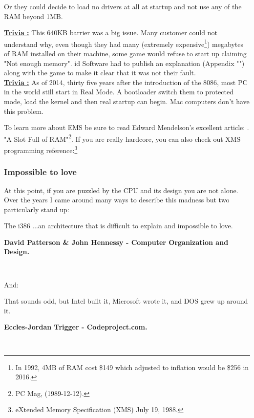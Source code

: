 \documentclass[book.tex]{subfiles}
\begin{document}
Or they could decide to load no drivers at all at startup and not use any of the RAM beyond 1MB.\\
\par
\textbf{\underline{Trivia :}}  This 640KB barrier was a big issue. Many customer could not understand why, even though they had many (extremely expensive\footnote{In 1992, 4MB of RAM cost \$149 which adjusted to inflation would be \$256 in 2016.}) megabytes of RAM installed on their machine, some game would refuse to start up claiming "Not enough memory". id Software had to publish an explanation (Appendix "") along with the game to make it clear that it was not their fault.\\

\textbf{\underline{Trivia :}}  As of 2014, thirty five years after the introduction of the 8086, most PC in the world still start in Real Mode. A bootloader switch them to protected mode, load the kernel and then real startup can begin. Mac computers don't have this problem.

\bigskip
To learn more about EMS be sure to read Edward Mendelson's excellent article: . "A Slot Full of RAM"\footnote{PC Mag, (1989-12-12).}. If you are really hardcore, you can also check out XMS programming reference:\footnote{eXtended Memory Specification (XMS) July 19, 1988.}\\
\par

\subsubsection{Impossible to love}
At this point, if you are puzzled by the CPU and its design you are not alone. Over the years I came around many ways to describe this madness but two particularly stand up:\\
\par
 \begin{fancyquotes}
   The i386 \lbrack...\rbrack an architecture that is difficult to explain and impossible to love.\\
   \par
\textbf{David Patterson \& John Hennessy - Computer Organization and Design.}
 \end{fancyquotes}\\
\par
And:
\par
 \begin{fancyquotes}
    That sounds odd, but Intel built it, Microsoft wrote it, and DOS grew up around it.\\
   \par
\textbf{Eccles-Jordan Trigger - Codeproject.com.}
 \end{fancyquotes}\\
\end{document}
